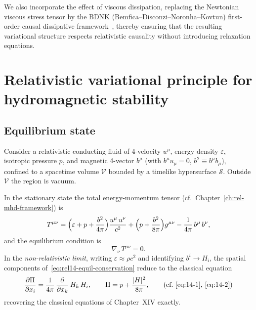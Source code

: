 We also incorporate the effect of viscous dissipation, replacing the
Newtonian viscous stress tensor by the BDNK
(Bemfica--Disconzi--Noronha--Kovtun) first-order causal dissipative
framework~\cite{BemficaDN2018,Kovtun2019,BemficaDN2019}, thereby ensuring
that the resulting variational structure respects relativistic causality
without introducing relaxation equations.

\section{Relativistic variational principle for hydromagnetic
  stability}\label{sec:rel-122}

\subsection{Equilibrium state}\label{sec:rel-122-equil}

Consider a relativistic conducting fluid of 4-velocity $u^{\mu}$,
energy density $\varepsilon$, isotropic pressure $p$, and magnetic
4-vector $b^{\mu}$ (with $b^{\mu}u_{\mu}=0$, $b^{2}\equiv
b^{\mu}b_{\mu}$), confined to a spacetime volume $\mathcal{V}$
bounded by a timelike hypersurface $\mathcal{S}$.  Outside $\mathcal{V}$
the region is vacuum.

In the stationary state the total energy-momentum tensor
(cf.\ Chapter~\ref{ch:rel-mhd-framework})
is
\begin{equation}
  T^{\mu\nu}
  = \Bigl(\varepsilon + p + \frac{b^{2}}{4\pi}\Bigr)
    \frac{u^{\mu}\,u^{\nu}}{c^{2}}
  + \Bigl(p + \frac{b^{2}}{8\pi}\Bigr)g^{\mu\nu}
  - \frac{1}{4\pi}\,b^{\mu}\,b^{\nu},
  \label{eq:rel14-Tmunu-equil}
\end{equation}
and the equilibrium condition is
\begin{equation}
  \nabla_{\nu}\,T^{\mu\nu} = 0.
  \label{eq:rel14-equil-conservation}
\end{equation}
In the \emph{non-relativistic limit}, writing $\varepsilon \approx
\rho c^{2}$ and identifying $b^{i}\to H_{i}$, the spatial components
of~\eqref{eq:rel14-equil-conservation} reduce to the classical
equation
\begin{equation}
  \frac{\partial \Pi}{\partial x_{i}}
  = \frac{1}{4\pi}\,\frac{\partial}{\partial x_{k}}\,H_{k}\,H_{i},
  \qquad
  \Pi = p + \frac{|\mathbf{H}|^{2}}{8\pi},
  \tag{cf.\ \ref{eq:14-1}, \ref{eq:14-2}}
\end{equation}
recovering the classical equations of Chapter~XIV exactly.

